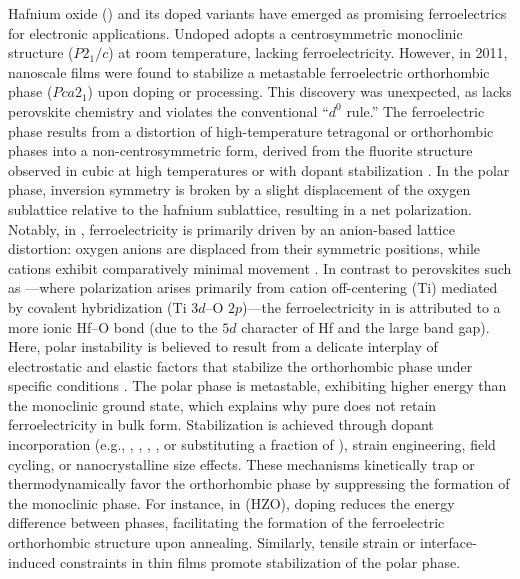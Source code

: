 \documentclass[a4paper,fleqn]{cas-sc}
\begin{document}
\par Hafnium oxide () and its doped variants have emerged as promising ferroelectrics for electronic applications. Undoped  adopts a centrosymmetric monoclinic structure ($P2_1/c$) at room temperature, lacking ferroelectricity. However, in 2011, nanoscale  films were found to stabilize a metastable ferroelectric orthorhombic phase ($Pca2_1$) upon doping or processing. This discovery was unexpected, as  lacks perovskite chemistry and  violates the conventional ``$d^0$ rule.'' The ferroelectric phase results from a distortion of high-temperature tetragonal or orthorhombic phases into a non-centrosymmetric form, derived from the fluorite structure observed in cubic  at high temperatures or with dopant stabilization \cite{Raeliarijaona2023}. In the polar phase, inversion symmetry is broken by a slight displacement of the oxygen sublattice relative to the hafnium sublattice, resulting in a net polarization. Notably, in , ferroelectricity is primarily driven by an anion-based lattice distortion: oxygen anions are displaced from their symmetric positions, while  cations exhibit comparatively minimal movement \cite{Zhu2024}. In contrast to perovskites such as ---where polarization arises primarily from cation off-centering (Ti) mediated by covalent hybridization (Ti $3d$--O $2p$)---the ferroelectricity in  is attributed to a more ionic Hf--O bond (due to the $5d$ character of Hf and the large band gap). Here, polar instability is believed to result from a delicate interplay of electrostatic and elastic factors that stabilize the orthorhombic phase under specific conditions \cite{Zhu2024}. The polar phase is metastable, exhibiting higher energy than the monoclinic ground state, which explains why pure  does not retain ferroelectricity in bulk form. Stabilization is achieved through dopant incorporation (e.g., , , , , or  substituting a fraction of ), strain engineering, field cycling, or nanocrystalline size effects. These mechanisms kinetically trap or thermodynamically favor the orthorhombic phase by suppressing the formation of the monoclinic phase. For instance, in  (HZO),  doping reduces the energy difference between phases, facilitating the formation of the ferroelectric orthorhombic structure upon annealing. Similarly, tensile strain or interface-induced constraints in thin films promote stabilization of the polar phase.
\end{document}
